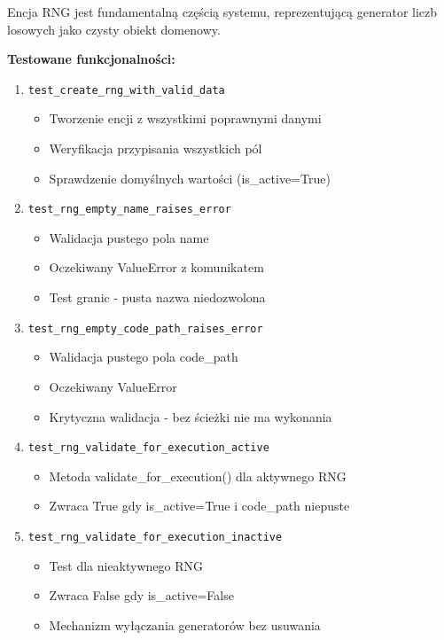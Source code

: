 \documentclass[12pt,a4paper]{article}
\begin{document}
Encja RNG jest fundamentalną częścią systemu, reprezentującą generator liczb losowych jako czysty obiekt domenowy.

\textbf{Testowane funkcjonalności:}
\begin{enumerate}
    \item \texttt{test\_create\_rng\_with\_valid\_data}
    \begin{itemize}
        \item Tworzenie encji z wszystkimi poprawnymi danymi
        \item Weryfikacja przypisania wszystkich pól
        \item Sprawdzenie domyślnych wartości (is\_active=True)
    \end{itemize}
    
    \item \texttt{test\_rng\_empty\_name\_raises\_error}
    \begin{itemize}
        \item Walidacja pustego pola name
        \item Oczekiwany ValueError z komunikatem
        \item Test granic - pusta nazwa niedozwolona
    \end{itemize}
    
    \item \texttt{test\_rng\_empty\_code\_path\_raises\_error}
    \begin{itemize}
        \item Walidacja pustego pola code\_path
        \item Oczekiwany ValueError
        \item Krytyczna walidacja - bez ścieżki nie ma wykonania
    \end{itemize}
    
    \item \texttt{test\_rng\_validate\_for\_execution\_active}
    \begin{itemize}
        \item Metoda validate\_for\_execution() dla aktywnego RNG
        \item Zwraca True gdy is\_active=True i code\_path niepuste
    \end{itemize}
    
    \item \texttt{test\_rng\_validate\_for\_execution\_inactive}
    \begin{itemize}
        \item Test dla nieaktywnego RNG
        \item Zwraca False gdy is\_active=False
        \item Mechanizm wyłączania generatorów bez usuwania
    \end{itemize}
    

\end{enumerate}
\end{document}

